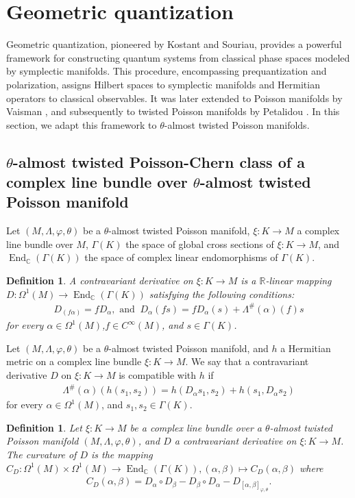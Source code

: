 \documentclass[a4paper,10pt]{article}
\numberwithin{equation}{section}
\theoremstyle{plain}
\newtheorem{definition}[theorem]{Definition}
\begin{document}
\section{Geometric quantization}\label{sec3}

Geometric quantization, pioneered by Kostant \cite{R22} and Souriau, provides a powerful framework for constructing quantum systems from classical phase spaces modeled by symplectic manifolds. This procedure, encompassing prequantization and polarization, assigns Hilbert spaces to symplectic manifolds and Hermitian operators to classical observables. It was later extended to Poisson manifolds by Vaisman \cite{R19}, and subsequently to twisted Poisson manifolds by Petalidou \cite{R2}. In this section, we adapt this framework to $\theta$-almost twisted Poisson manifolds.

	\subsection{$\theta$-almost twisted Poisson-Chern class of a  complex line bundle over  $\theta$-almost twisted Poisson manifold}
	Let $(M,\Lambda,\varphi,\theta)$  be a $\theta$-almost twisted Poisson manifold,  $\xi: K\to M$  a complex line bundle over $M$, $\Gamma (K)$ the space of global cross sections of  $\xi: K\to M$, and $\operatorname{End}_\mathbb{C}(\Gamma (K))$ the space of complex  linear endomorphisms of $ \Gamma (K)$.
	\begin{definition}\label{Def1}
		A contravariant derivative  on  $\xi: K\to M$   is a $\mathbb{R}$-linear mapping  $D: \Omega^1(M)\to \operatorname{End}_\mathbb{C}(\Gamma (K))$   satisfying the  following  conditions:
		\begin{align}\label{Eq4}
		D_{(f\alpha)}=fD_\alpha, \text{ and }\ D_\alpha(fs)=fD_\alpha(s)+ \Lambda^\#(\alpha)(f)s
		\end{align}
		for every $\alpha\in \Omega^1(M)$,$f\in C^\infty(M)$,   and $s\in \Gamma (K)$.
	\end{definition}
	Let  $(M,\Lambda,\varphi,\theta)$  be a $\theta$-almost twisted Poisson manifold, and $h$  a Hermitian metric on a complex line bundle  $\xi: K\to M$. We say that a  contravariant derivative $D$ on  $\xi: K\to M$ is compatible with $h$ if
	\begin{align}\label{Eq6}
	\Lambda^\#(\alpha)(h(s_1,s_2))=h(D_\alpha s_1,s_2)+h(s_1,D_\alpha s_2)
	\end{align}
	for every $\alpha\in  \Omega^1(M)$,  and  $s_1,s_2\in \Gamma (K)$.
	\begin{definition}
		Let $\xi: K\to M$ be   a complex line bundle over a $\theta$-almost twisted Poisson manifold $(M,\Lambda,\varphi,\theta)$, and $D$ a
		contravariant derivative on $\xi: K\to M$.  The curvature of $D$ is the mapping  $C_D: \Omega^1(M)\times \Omega^1(M)\longrightarrow \operatorname{End}_\mathbb{C}(\Gamma (K)), (\alpha,\beta)\mapsto C_D(\alpha,\beta)$  where
		\begin{align}\label{Eq7}
		C_D(\alpha,\beta)=D_\alpha\circ D_\beta-D_\beta\circ D_\alpha-D_{[\alpha,\beta]_{\varphi,\theta}}.
		\end{align}
	\end{definition}
\end{document}
